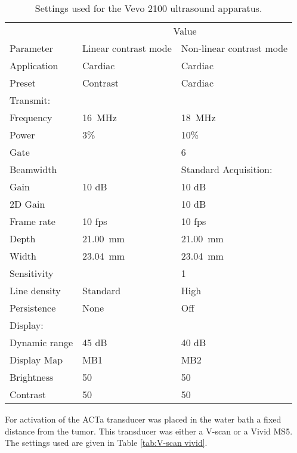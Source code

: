 \begin{table}[htb]
\label{tab:Vevo Ultrasound settings}
\caption{Settings used for the Vevo 2100 ultrasound apparatus.}
\begin{center}
\begin{tabular}{@{}l l l @{}}\toprule
& \multicolumn{2}{c}{Value} \\ \cmidrule(r){2-3}
Parameter & Linear contrast mode & Non-linear contrast mode\\
\midrule
Application & Cardiac & Cardiac\\
Preset & Contrast & Cardiac\\
Transmit:\\
Frequency & \SI{16}{\mega\hertz} & \SI{18}{\mega\hertz}\\
Power & 3\% & 10\%\\
Gate & & 6\\
Beamwidth & & Standard
Acquisition:\\
Gain & 10 dB & 10 dB\\
2D Gain & & 10 dB\\  
Frame rate & 10 fps & 10 fps\\
Depth & \SI{21.00}{\milli\meter} & \SI{21.00}{\milli\meter}\\
Width & \SI{23.04}{\milli\meter} & \SI{23.04}{\milli\meter}\\
Sensitivity & &1\\
Line density & Standard & High \\ 
Persistence & None & Off \\
Display:\\
Dynamic range &45 dB &40 dB \\
Display Map & MB1 & MB2\\
Brightness & 50 & 50\\
Contrast & 50 & 50 \\
  \bottomrule
\end{tabular}
\end{center}
\end{table}

For activation of the ACT\textregistered a transducer was placed in the water bath a fixed distance from the tumor. This transducer was either a V-scan or a Vivid MS5. The settings used are given in Table \ref{tab:V-scan vivid}.

